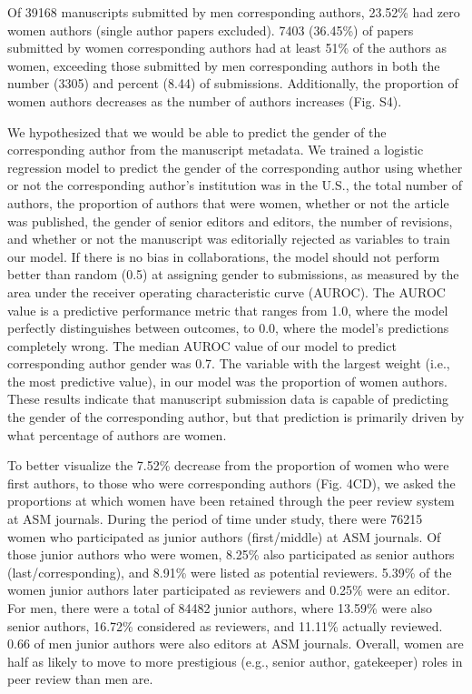 \documentclass[11pt,]{article}
\begin{document}
Of 39168 manuscripts submitted by men corresponding authors, 23.52\% had
zero women authors (single author papers excluded). 7403 (36.45\%) of
papers submitted by women corresponding authors had at least 51\% of the
authors as women, exceeding those submitted by men corresponding authors
in both the number (3305) and percent (8.44) of submissions.
Additionally, the proportion of women authors decreases as the number of
authors increases (Fig. S4).

We hypothesized that we would be able to predict the gender of the
corresponding author from the manuscript metadata. We trained a logistic
regression model to predict the gender of the corresponding author using
whether or not the corresponding author's institution was in the U.S.,
the total number of authors, the proportion of authors that were women,
whether or not the article was published, the gender of senior editors
and editors, the number of revisions, and whether or not the manuscript
was editorially rejected as variables to train our model. If there is no
bias in collaborations, the model should not perform better than random
(0.5) at assigning gender to submissions, as measured by the area under
the receiver operating characteristic curve (AUROC). The AUROC value is
a predictive performance metric that ranges from 1.0, where the model
perfectly distinguishes between outcomes, to 0.0, where the model's
predictions completely wrong. The median AUROC value of our model to
predict corresponding author gender was 0.7. The variable with the
largest weight (i.e., the most predictive value), in our model was the
proportion of women authors. These results indicate that manuscript
submission data is capable of predicting the gender of the corresponding
author, but that prediction is primarily driven by what percentage of
authors are women.

To better visualize the 7.52\% decrease from the proportion of women who
were first authors, to those who were corresponding authors (Fig. 4CD),
we asked the proportions at which women have been retained through the
peer review system at ASM journals. During the period of time under
study, there were 76215 women who participated as junior authors
(first/middle) at ASM journals. Of those junior authors who were women,
8.25\% also participated as senior authors (last/corresponding), and
8.91\% were listed as potential reviewers. 5.39\% of the women junior
authors later participated as reviewers and 0.25\% were an editor. For
men, there were a total of 84482 junior authors, where 13.59\% were also
senior authors, 16.72\% considered as reviewers, and 11.11\% actually
reviewed. 0.66 of men junior authors were also editors at ASM journals.
Overall, women are half as likely to move to more prestigious (e.g.,
senior author, gatekeeper) roles in peer review than men are.
\end{document}
